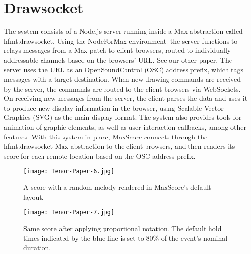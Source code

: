 \section{Drawsocket}
The \drawsocket system consists of a Node.js server running inside a Max abstraction called hfmt.drawsocket.
Using the NodeForMax environment, the server functions to relays messages from a Max patch to client browsers, routed to individually addressable channels based on the browsers' URL. {\color{red} See our other paper}.
The server uses the URL as an OpenSoundControl (OSC) address prefix, which tags messages with a target destination.
When new drawing commands are received by the server, the commands are routed to the client browsers via WebSockets.
On receiving new messages from the server, the client parses the data and uses it to produce new display information in the browser, using Scalable Vector Graphics (SVG) as the main display format.
The system also provides tools for animation of graphic elements, as well as user interaction callbacks, among other features.
With this system in place, MaxScore connects through the hfmt.drawsocket Max abstraction to the client browsers, and then renders its score for each remote location based on the OSC address prefix.







\begin{figure*}[h]
    \centering
    \begin{minipage}{0.45\textwidth}
        \centering
        \texttt{[image: Tenor-Paper-6.jpg]} 
                \caption{A score with a random melody rendered in MaxScore’s default layout.
        \label{fig:Tenor-Paper-6}}
    \end{minipage}\hfill
    \begin{minipage}{0.45\textwidth}
        \centering
        \texttt{[image: Tenor-Paper-7.jpg]} 
       	\caption{Same score after applying proportional notation. The default hold times indicated by the blue line is set to 80\% of the event’s nominal duration.
\label{fig:Tenor-Paper-7}}
    \end{minipage}
\end{figure*}

